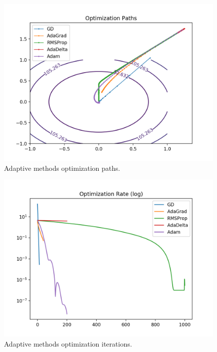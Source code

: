 \documentclass[twoside,11pt]{homework}
\DeclarePairedDelimiter{\2norm}{\lVert}{\rVert^2_2}
\newcommand{\1}[1]{\mathds{1}\left[#1\right]}
\begin{document}
\begin{enumerate}[\bf (i)]
\begin{enumerate}
        \begin{figure}[h!]
         \centering
         \includegraphics[width=6in]{img/adas.png}
         \caption{Adaptive methods optimization paths.}
         \label{fig:sgdm}
       \end{figure}

       \begin{figure}[h!]
         \centering
         \includegraphics[width=6in]{img/adas2.png}
         \caption{Adaptive methods optimization iterations.}
         \label{fig:sgdm2}
       \end{figure}


\end{enumerate}
\end{enumerate}
\end{document}
